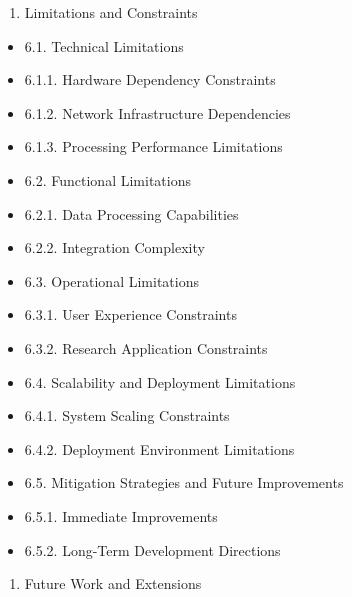 \documentclass[11pt,a4paper]{report}
\begin{document}
\begin{enumerate}
\item Limitations and Constraints
\end{enumerate}
\begin{itemize}
\item 6.1. Technical Limitations
\item 6.1.1. Hardware Dependency Constraints
\item 6.1.2. Network Infrastructure Dependencies
\item 6.1.3. Processing Performance Limitations
\item 6.2. Functional Limitations
\item 6.2.1. Data Processing Capabilities
\item 6.2.2. Integration Complexity
\item 6.3. Operational Limitations
\item 6.3.1. User Experience Constraints
\item 6.3.2. Research Application Constraints
\item 6.4. Scalability and Deployment Limitations
\item 6.4.1. System Scaling Constraints
\item 6.4.2. Deployment Environment Limitations
\item 6.5. Mitigation Strategies and Future Improvements
\item 6.5.1. Immediate Improvements
\item 6.5.2. Long-Term Development Directions
\end{itemize}
\begin{enumerate}
\item Future Work and Extensions
\end{enumerate}
\end{document}
